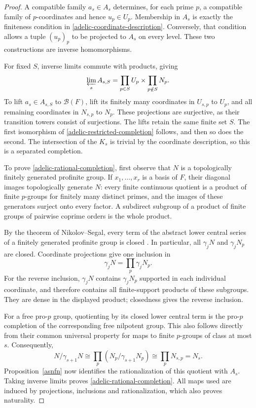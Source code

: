 \documentclass[11pt,a4paper]{article}
\begin{document}
\begin{proof}
A compatible family $a_s\in A_s$ determines, for each prime $p$, a
compatible family of $p$-coordinates and hence $u_p\in U_p$.
Membership in $A_s$ is exactly the finiteness condition in
\eqref{adelic-coordinate-description}.  Conversely, that condition
allows a tuple $(u_p)_p$ to be projected to $A_s$ on every level.
These two constructions are inverse homomorphisms.

For fixed $S$, inverse limits commute with products, giving
\[
 \varprojlim_sA_{s,S}
 =\prod_{p\in S}U_p\times\prod_{p\notin S}N_p.
\]
To lift $a_s\in A_{s,S}$ to $\mathcal B(F)$, lift its finitely many
coordinates in $U_{s,p}$ to $U_p$, and all remaining coordinates in
$N_{s,p}$ to $N_p$.  These projections are surjective, as their
transition towers consist of surjections.  The lifts retain the same
finite set $S$.  The first isomorphism of
\eqref{adelic-restricted-completion} follows, and then so does the
second.  The intersection of the $K_s$ is trivial by the coordinate
description, so this is a separated completion.

To prove \eqref{adelic-rational-completion}, first observe that $N$ is
a topologically finitely generated profinite group.  If $x_1,\ldots,x_r$
is a basis of $F$, their diagonal images topologically generate $N$:
every finite continuous quotient is a product of finite $p$-groups for
finitely many distinct primes, and the images of these generators
surject onto every factor.  A subdirect subgroup of a product of finite
groups of pairwise coprime orders is the whole product.

By the theorem of Nikolov--Segal, every term of the abstract lower
central series of a finitely generated profinite group is closed
\cite{NS2007}.  In particular, all $\gamma_jN$ and $\gamma_jN_p$ are
closed.  Coordinate projections give one inclusion in
\[
 \gamma_jN=\prod_p\gamma_jN_p.
\]
For the reverse inclusion, $\gamma_jN$ contains $\gamma_jN_p$ supported
in each individual coordinate, and therefore contains all finite-support
products of these subgroups.  They are dense in the displayed product;
closedness gives the reverse inclusion.

For a free pro-$p$ group, quotienting by its closed lower central term
is the pro-$p$ completion of the corresponding free nilpotent group.
This also follows directly from their common universal property for
maps to finite $p$-groups of class at most $s$.  Consequently,
\[
 N/\gamma_{s+1}N
 \cong\prod_p(N_p/\gamma_{s+1}N_p)
 \cong\prod_pN_{s,p}=N_s.
\]
Proposition~\ref{asnfn} now identifies the rationalization of this
quotient with $A_s$.  Taking inverse limits proves
\eqref{adelic-rational-completion}.  All maps used are induced by
projections, inclusions and rationalization, which also proves naturality.
\end{proof}
\end{document}
